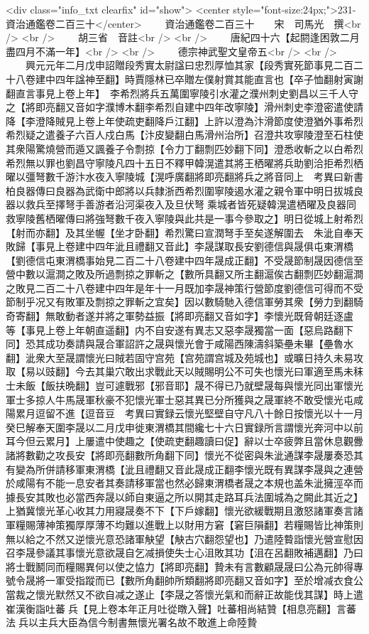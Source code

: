 <div class="info_txt clearfix" id="show">
<center style="font-size:24px;">231-資治通鑑卷二百三十</center>
  　　資治通鑑卷二百三十　　宋　司馬光　撰<br />
<br />
　　胡三省　音註<br />
<br />
　　唐紀四十六【起閼逢困敦二月盡四月不滿一年】<br />
<br />
　　德宗神武聖文皇帝五<br />
<br />
　　興元元年二月戊申詔贈段秀實太尉諡曰忠烈厚恤其家【段秀實死節事見二百二十八卷建中四年諡神至翻】時賈隱林已卒贈左僕射賞其能直言也【卒子恤翻射寅謝翻直言事見上卷上年】　李希烈將兵五萬圍寧陵引水灌之濮州刺史劉昌以三千人守之【將即亮翻又音如字濮博木翻李希烈自建中四年改寧陵】滑州刺史李澄密遣使請降【李澄降賊見上卷上年使疏吏翻降戶江翻】上許以澄為汴滑節度使澄猶外事希烈希烈疑之遣養子六百人戍白馬【汴皮變翻白馬滑州治所】召澄共攻寧陵澄至石柱使其衆陽驚燒營而遁又諷養子令剽掠【令力丁翻剽匹妙翻下同】澄悉收斬之以白希烈希烈無以罪也劉昌守寧陵凡四十五日不釋甲韓滉遣其將王栖曜將兵助劉洽拒希烈栖曜以彊弩數千游汴水夜入寧陵城【滉呼廣翻將即亮翻將兵之將音同上　考異曰新書柏良器傳曰良器為武衛中郎將以兵隸浙西希烈圍寧陵遏水灌之親令軍中明日拔城良器以救兵至擇弩手善游者沿河渠夜入及旦伏弩乘城者皆死疑韓滉遣栖曜及良器同救寧陵舊栖曜傳曰將強弩數千夜入寧陵與此共是一事今參取之】明日從城上射希烈【射而亦翻】及其坐幄【坐才卧翻】希烈驚曰宣潤弩手至矣遂解圍去　朱泚自奉天敗歸【事見上卷建中四年泚且禮翻又音此】李晟謀取長安劉德信與晟俱屯東渭橋【劉德信屯東渭橋事始見二百二十八卷建中四年晟成正翻】不受晟節制晟因德信至營中數以滬澗之敗及所過剽掠之罪斬之【數所具翻又所主翻滬俟古翻剽匹妙翻滬澗之敗見二百二十八卷建中四年是年十一月既加李晟神策行營節度劉德信可得而不受節制乎况又有敗軍及剽掠之罪斬之宜矣】因以數騎馳入德信軍勞其衆【勞力到翻騎奇寄翻】無敢動者遂并將之軍勢益振【將即亮翻又音如字】李懷光既脅朝廷逐盧等【事見上卷上年朝直遥翻】内不自安遂有異志又惡李晟獨當一面【惡烏路翻下同】恐其成功奏請與晟合軍詔許之晟與懷光會于咸陽西陳濤斜築壘未畢【壘魯水翻】泚衆大至晟謂懷光曰賊若固守宫苑【宫苑謂宫城及苑城也】或曠日持久未易攻取【易以豉翻】今去其巢穴敢出求戰此天以賊賜明公不可失也懷光曰軍適至馬未秣士未飯【飯扶晩翻】豈可遽戰邪【邪音耶】晟不得已乃就壁晟每與懷光同出軍懷光軍士多掠人牛馬晟軍秋豪不犯懷光軍士惡其異已分所獲與之晟軍終不敢受懷光屯咸陽累月逗留不進【逗音豆　考異曰實録云懷光堅壁自守凡八十餘日按懷光以十一月癸巳解奉天圍李晟以二月戊申徙東渭橋其間纔七十六日實録所言謂懷光奔河中以前耳今但云累月】上屢遣中使趣之【使疏吏翻趣讀曰促】辭以士卒疲弊且當休息觀釁諸將數勸之攻長安【將即亮翻數所角翻下同】懷光不從密與朱泚通謀李晟屢奏恐其有變為所併請移軍東渭橋【泚且禮翻又音此晟成正翻李懷光既有異謀李晟與之連營於咸陽有不能一息安者其奏請移軍當也然必歸東渭橋者晟之本規也盖朱泚擁涇卒而據長安其敗也必當西奔晟以師自東逼之所以開其走路耳兵法圍城為之闕此其近之】上猶冀懷光革心收其力用寢晟奏不下【下戶嫁翻】懷光欲緩戰期且激怒諸軍奏言諸軍糧賜薄神策獨厚厚薄不均難以進戰上以財用方窘【窘巨隕翻】若糧賜皆比神策則無以給之不然又逆懷光意恐諸軍觖望【觖古穴翻怨望也】乃遣陸䞇詣懷光營宣慰因召李晟參議其事懷光意欲晟自乞减損使失士心沮敗其功【沮在呂翻敗補邁翻】乃曰將士戰鬭同而糧賜異何以使之恊力【將即亮翻】贄未有言數顧晟晟曰公為元帥得專號令晟將一軍受指蹤而已【數所角翻帥所類翻將即亮翻又音如字】至於增减衣食公當裁之懷光默然又不欲自减之遂止【李晟之答懷光氣和而辭正故能伐其謀】時上遣崔漢衡詣吐蕃兵【見上卷本年正月吐從暾入聲】吐蕃相尚結贊【相息亮翻】言蕃法兵以主兵大臣為信今制書無懷光署名故不敢進上命陸贄